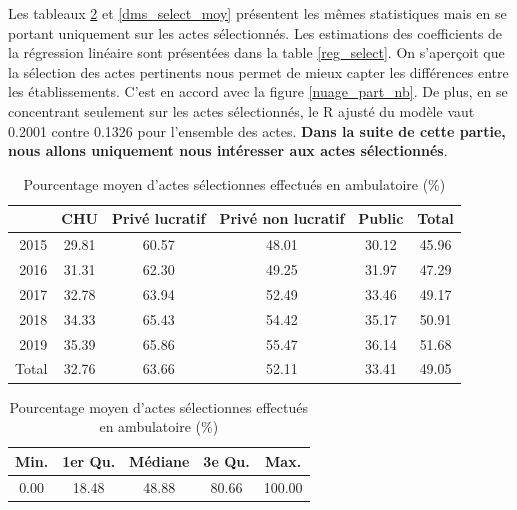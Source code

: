 \newpage



Les tableaux \ref{part_ambu_select} et \ref{dms_select_moy} présentent les mêmes statistiques mais en se portant uniquement sur les actes sélectionnés. Les estimations des coefficients de la régression linéaire sont présentées dans la table \ref{reg_select}. On s'aperçoit que la sélection des actes pertinents nous permet de mieux capter les différences entre les établissements. C'est en accord avec la figure \ref{nuage_part_nb}. De plus, en se concentrant seulement sur les actes sélectionnés, le R ajusté du modèle vaut 0.2001 contre 0.1326 pour l'ensemble des actes. \textbf{Dans la suite de cette partie, nous allons uniquement nous intéresser aux actes sélectionnés}.

\begin{table}[ht]
\centering
\caption{Pourcentage moyen d'actes sélectionnes effectués en ambulatoire (\%)} 
\label{part_ambu_select}
\begin{tabular}{r|cccc|c}
  \hline
 & CHU & Privé lucratif & Privé non lucratif & Public & Total \\ 
  \hline
2015 & 29.81 & 60.57 & 48.01 & 30.12 & 45.96 \\ 
  2016 & 31.31 & 62.30 & 49.25 & 31.97 & 47.29 \\ 
  2017 & 32.78 & 63.94 & 52.49 & 33.46 & 49.17 \\ 
  2018 & 34.33 & 65.43 & 54.42 & 35.17 & 50.91 \\ 
  2019 & 35.39 & 65.86 & 55.47 & 36.14 & 51.68 \\ 
  \hline
  Total & 32.76 & 63.66 & 52.11 & 33.41 & 49.05 \\ 
   \hline
\end{tabular}

\bigskip

\begin{tabular}{ccccc}
  \hline
Min. & 1er Qu. & Médiane & 3e Qu. & Max. \\ 
  \hline
0.00 & 18.48 & 48.88 & 80.66 & 100.00 \\ 
   \hline
\end{tabular}
\end{table}


